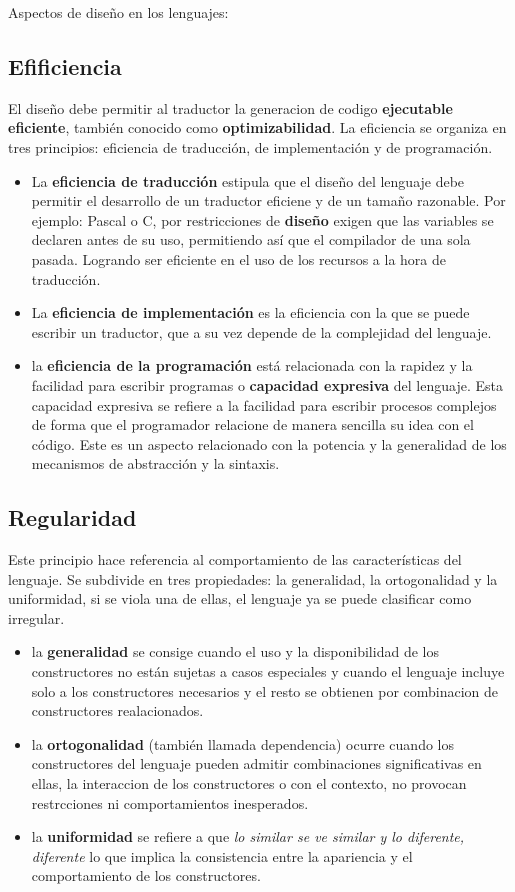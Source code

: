 \documentclass{article}
\begin{document}
Aspectos de dise\~{n}o en los lenguajes:
\subsection{Efificiencia}
El dise\~{n}o debe permitir al traductor la generacion de codigo \textbf{ejecutable eficiente}, tambi\'en conocido como \textbf{optimizabilidad}.
La eficiencia se organiza en tres principios: eficiencia de traducci\'on, de implementaci\'on y de programaci\'on.

\begin{itemize}
\item La \textbf{eficiencia de traducci\'on} estipula que el dise\~{n}o del lenguaje debe permitir el desarrollo de un traductor eficiene y de un tama\~{n}o razonable. Por ejemplo: Pascal o C, por restricciones de \textbf{dise\~{n}o} exigen que las variables se declaren antes de su uso, permitiendo as\'i que el compilador de una sola pasada. Logrando ser eficiente en el uso de los recursos a la hora de traducci\'on.
\item La \textbf{eficiencia de implementaci\'on} es la eficiencia con la que se puede escribir un traductor, que a su vez depende de la complejidad del lenguaje.
\item la \textbf{eficiencia de la programaci\'on} est\'a relacionada con la rapidez y la facilidad para escribir programas o \textbf{capacidad expresiva} del lenguaje. Esta capacidad expresiva se refiere a la facilidad para escribir procesos complejos de forma que el programador relacione de manera sencilla su idea con el c\'odigo.
Este es un aspecto relacionado con la potencia y la generalidad de los mecanismos de abstracci\'on y la sintaxis.
\end{itemize}

\subsection{Regularidad}
Este principio hace referencia al comportamiento de las caracter\'isticas del lenguaje. Se subdivide en tres propiedades: la generalidad, la ortogonalidad y la uniformidad, si se viola una de ellas, el lenguaje ya se puede clasificar como irregular.

\begin{itemize}
\item la \textbf{generalidad} se consige cuando el uso y la disponibilidad de los constructores no est\'an sujetas a casos especiales y cuando el lenguaje incluye solo a los constructores necesarios y el resto se obtienen por combinacion de constructores realacionados.
\item la \textbf{ortogonalidad} (tambi\'en llamada dependencia) ocurre cuando los constructores del lenguaje pueden admitir combinaciones significativas en ellas, la interaccion de los constructores o con el contexto, no provocan restrcciones ni comportamientos inesperados.
\item la \textbf{uniformidad} se refiere a que \textit{lo similar se ve similar y lo diferente, diferente} lo que implica la consistencia entre la apariencia y el comportamiento de los constructores.
\end{itemize}
\end{document}
